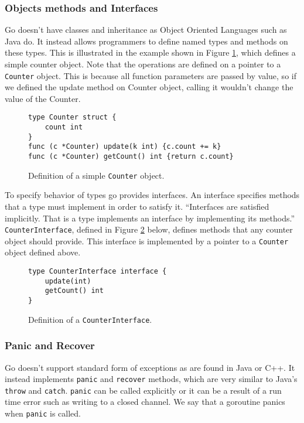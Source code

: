 \subsubsection{Objects methods and Interfaces}
Go doesn't have classes and inheritance as Object Oriented Languages 
such as Java do. It instead allows programmers to define named types
and methods on these types. This is illustrated in the example shown in 
Figure \ref{fig:counterObj}, which defines a simple counter object.
Note that the operations are defined on a pointer to a \texttt{Counter}
object. This is because all function parameters are passed by value, so
if we defined the update method on Counter object, calling it wouldn't
change the value of the Counter.

\begin{figure}[h]
\centering
\begin{lstlisting}
type Counter struct {
    count int
}
func (c *Counter) update(k int) {c.count += k}
func (c *Counter) getCount() int {return c.count}
\end{lstlisting}
\caption[scale=1.0]{Definition of a simple \texttt{Counter} object.}
\label{fig:counterObj}
\end{figure}

To specify behavior of types go provides interfaces. An interface
specifies methods that a type must implement in order to satisfy it.
``Interfaces are satisfied implicitly. That is a type implements 
an interface by implementing its methods.'' \cite{tour}
\texttt{CounterInterface}, defined in Figure \ref{fig:counterInter} below,
defines methods that any counter object should provide. This interface 
is implemented by a pointer to a \texttt{Counter} object defined above.

\begin{figure}[h]
\centering
\begin{lstlisting}
type CounterInterface interface {
    update(int)
    getCount() int
}
\end{lstlisting}
\caption[scale=1.0]{Definition of a \texttt{CounterInterface}.}
\label{fig:counterInter}
\end{figure}

\subsubsection{Panic and Recover}
Go doesn't support standard form of exceptions as are found in Java or
C++. It instead implements \texttt{panic} and \texttt{recover} methods, 
which are very similar to Java's \texttt{throw} and \texttt{catch}.
\texttt{panic} can be called explicitly or it can be a result of 
a run time error such as writing to a closed channel. We say that 
a goroutine panics when \texttt{panic} is called.


